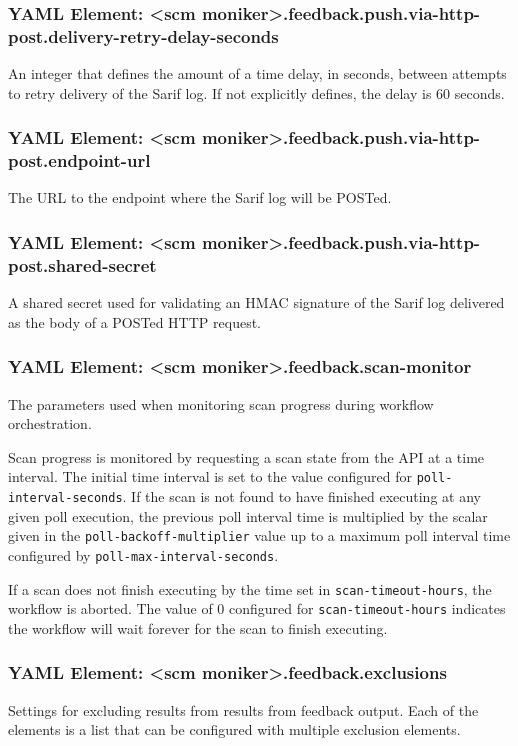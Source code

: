 \subsubsection{YAML Element: <scm moniker>.feedback.push.via-http-post.delivery-retry-delay-seconds}\label{sec:yaml-push-via-http-post-delivery-retry-delay-seconds}
An integer that defines the amount of a time delay, in seconds, between attempts to retry delivery of the Sarif log.  If not explicitly defines, the
delay is 60 seconds.

\subsubsection{YAML Element: <scm moniker>.feedback.push.via-http-post.endpoint-url}\label{sec:yaml-push-via-http-post-endpoint-url}
The URL to the endpoint where the Sarif log will be POSTed.


\subsubsection{YAML Element: <scm moniker>.feedback.push.via-http-post.shared-secret}\label{sec:yaml-push-via-http-post-shared-secret}
A shared secret used for validating an HMAC signature of the Sarif log delivered as the body of a POSTed HTTP request.


\subsubsection{YAML Element: <scm moniker>.feedback.scan-monitor}\label{sec:yaml-feedback-scan-monitor}
The parameters used when monitoring scan progress during workflow orchestration. 

Scan progress is monitored by requesting a scan state from the \cxone API at
a time interval.  The initial time interval is set to the value configured for
\texttt{poll-interval-seconds}.  If the scan is not found to have finished executing
at any given poll execution, the previous poll interval time is multiplied by
the scalar given in the \texttt{poll-backoff-multiplier} value up to a maximum
poll interval time configured by \texttt{poll-max-interval-seconds}.

If a scan does not finish executing by the time set in \texttt{scan-timeout-hours}, the
workflow is aborted.  The value of 0 configured for \texttt{scan-timeout-hours} indicates
the workflow will wait forever for the scan to finish executing.

\subsubsection{YAML Element: <scm moniker>.feedback.exclusions}\label{sec:yaml-feedback-exclusions}
Settings for excluding results from results from feedback output.  Each of the elements is a list that 
can be configured with multiple exclusion elements.
